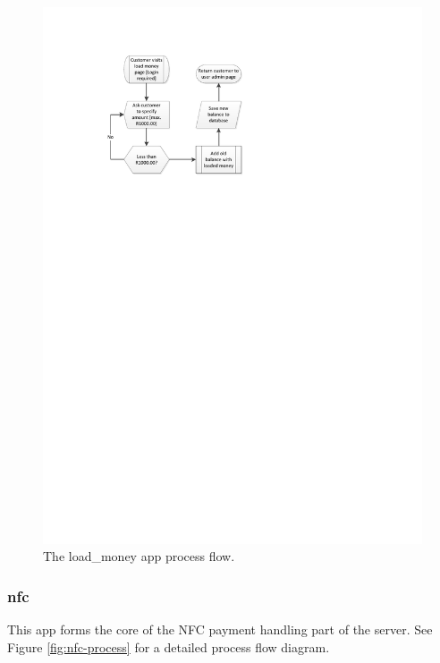 \begin{figure}
 \centering 
 \includegraphics[clip=true, trim = 0 580 100 60,
 scale=0.7]{load_money}
 \caption{The load\_money app process flow.}
 \label{fig:load-money}
\end{figure}

\subsubsection{nfc}
\label{sec:app-nfc}

This app forms the core of the NFC payment handling part of the server. See Figure
\ref{fig:nfc-process} for a detailed process flow diagram.


